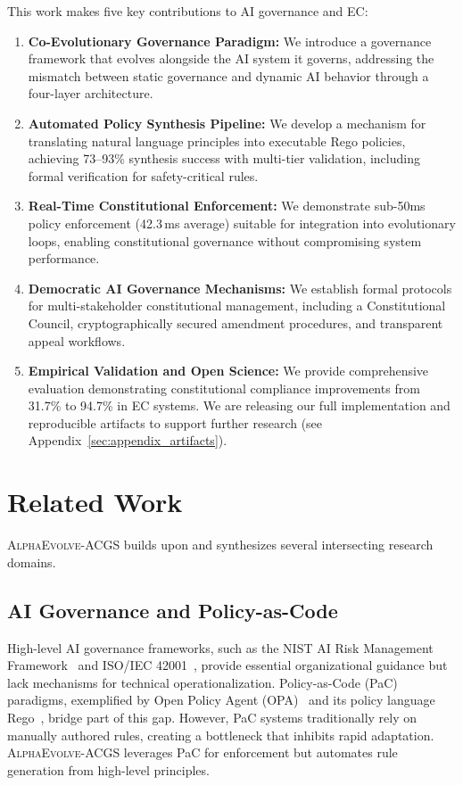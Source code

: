 \documentclass[10pt,twocolumn]{article}
\newcommand{\acgs}{\textsc{AlphaEvolve-ACGS}}
\theoremstyle{definition}
\begin{document}
This work makes five key contributions to AI governance and EC:
\begin{enumerate}[leftmargin=*,topsep=2pt,itemsep=2pt,parsep=0pt]
    \item \textbf{Co-Evolutionary Governance Paradigm:} We introduce a governance framework that evolves alongside the AI system it governs, addressing the mismatch between static governance and dynamic AI behavior through a four-layer architecture.
    \item \textbf{Automated Policy Synthesis Pipeline:} We develop a mechanism for translating natural language principles into executable Rego policies, achieving 73--93\% synthesis success with multi-tier validation, including formal verification for safety-critical rules.
    \item \textbf{Real-Time Constitutional Enforcement:} We demonstrate sub-50ms policy enforcement (42.3\,ms average) suitable for integration into evolutionary loops, enabling constitutional governance without compromising system performance.
    \item \textbf{Democratic AI Governance Mechanisms:} We establish formal protocols for multi-stakeholder constitutional management, including a Constitutional Council, cryptographically secured amendment procedures, and transparent appeal workflows.
    \item \textbf{Empirical Validation and Open Science:} We provide comprehensive evaluation demonstrating constitutional compliance improvements from 31.7\% to 94.7\% in EC systems. We are releasing our full implementation and reproducible artifacts to support further research (see Appendix~\ref{sec:appendix_artifacts}).
\end{enumerate}

\section{Related Work}
\label{sec:related_work}
\acgs{} builds upon and synthesizes several intersecting research domains.

\subsection{AI Governance and Policy-as-Code}
High-level AI governance frameworks, such as the NIST AI Risk Management Framework~\cite{nist2023ai} and ISO/IEC 42001~\cite{iso42001}, provide essential organizational guidance but lack mechanisms for technical operationalization. Policy-as-Code (PaC) paradigms, exemplified by Open Policy Agent (OPA)~\cite{opa2023} and its policy language Rego~\cite{rego2019}, bridge part of this gap. However, PaC systems traditionally rely on manually authored rules, creating a bottleneck that inhibits rapid adaptation. \acgs{} leverages PaC for enforcement but automates rule generation from high-level principles.
\end{document}
